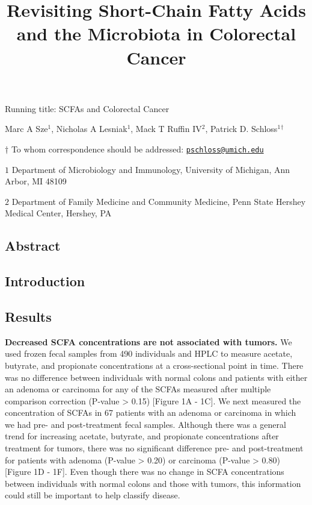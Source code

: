 \documentclass[11pt,]{article}
\title{Revisiting Short-Chain Fatty Acids and the Microbiota in Colorectal
Cancer}
\author{}
\date{}
\begin{document}
\maketitle

\vspace{35mm}

Running title: SCFAs and Colorectal Cancer

\vspace{35mm}

Marc A Sze\({^1}\), Nicholas A Lesniak\({^1}\), Mack T Ruffin
IV\({^2}\), Patrick D. Schloss\({^1}\)\({^\dagger}\)

\vspace{40mm}

\(\dagger\) To whom correspondence should be addressed:
\href{mailto:pschloss@umich.edu}{\nolinkurl{pschloss@umich.edu}}

\(1\) Department of Microbiology and Immunology, University of Michigan,
Ann Arbor, MI 48109

\(2\) Department of Family Medicine and Community Medicine, Penn State
Hershey Medical Center, Hershey, PA

\newpage

\linenumbers

\subsection{Abstract}\label{abstract}

\newpage

\subsection{Introduction}\label{introduction}

\newpage

\subsection{Results}\label{results}

\textbf{Decreased SCFA concentrations are not associated with tumors.}
We used frozen fecal samples from 490 individuals and HPLC to measure
acetate, butyrate, and propionate concentrations at a cross-sectional
point in time. There was no difference between individuals with normal
colons and patients with either an adenoma or carcinoma for any of the
SCFAs measured after multiple comparison correction (P-value
\textgreater{} 0.15) {[}Figure 1A - 1C{]}. We next measured the
concentration of SCFAs in 67 patients with an adenoma or carcinoma in
which we had pre- and post-treatment fecal samples. Although there was a
general trend for increasing acetate, butyrate, and propionate
concentrations after treatment for tumors, there was no significant
difference pre- and post-treatment for patients with adenoma (P-value
\textgreater{} 0.20) or carcinoma (P-value \textgreater{} 0.80)
{[}Figure 1D - 1F{]}. Even though there was no change in SCFA
concentrations between individuals with normal colons and those with
tumors, this information could still be important to help classify
disease.
\end{document}
